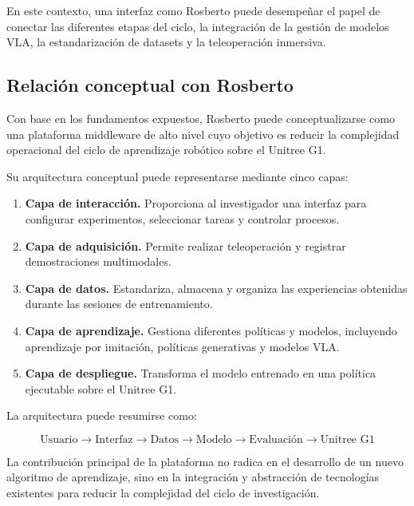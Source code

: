 \documentclass[stu,12pt,floatsintext]{apa7}
\begin{document}
En este contexto, una interfaz como Rosberto puede desempeñar el papel de conectar las diferentes etapas del ciclo, la integración de la gestión de modelos VLA, la estandarización de datasets y la teleoperación inmersiva.

\subsection{Relación conceptual con Rosberto}

Con base en los fundamentos expuestos, Rosberto puede conceptualizarse como una plataforma middleware de alto nivel cuyo objetivo es reducir la complejidad operacional del ciclo de aprendizaje robótico sobre el Unitree G1.

Su arquitectura conceptual puede representarse mediante cinco capas:

\begin{enumerate}
    \item \textbf{Capa de interacción.} Proporciona al investigador una interfaz para configurar experimentos, seleccionar tareas y controlar procesos.
    
    \item \textbf{Capa de adquisición.} Permite realizar teleoperación y registrar demostraciones multimodales.
    
    \item \textbf{Capa de datos.} Estandariza, almacena y organiza las experiencias obtenidas durante las sesiones de entrenamiento.
    
    \item \textbf{Capa de aprendizaje.} Gestiona diferentes políticas y modelos, incluyendo aprendizaje por imitación, políticas generativas y modelos VLA.
    
    \item \textbf{Capa de despliegue.} Transforma el modelo entrenado en una política ejecutable sobre el Unitree G1.
\end{enumerate}

La arquitectura puede resumirse como:

\begin{equation}
\boxed{
\text{Usuario}
\rightarrow
\text{Interfaz}
\rightarrow
\text{Datos}
\rightarrow
\text{Modelo}
\rightarrow
\text{Evaluación}
\rightarrow
\text{Unitree G1}
}
\end{equation}

La contribución principal de la plataforma no radica en el desarrollo de un nuevo algoritmo de aprendizaje, sino en la integración y abstracción de tecnologías existentes para reducir la complejidad del ciclo de investigación.
\end{document}
